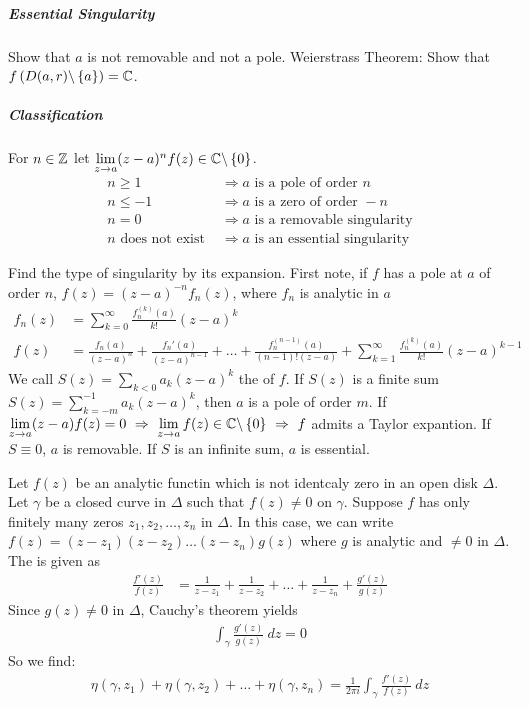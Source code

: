 \subparagraph{Essential Singularity}
Show that $a$ is not removable and not a pole. Weierstrass Theorem: Show that
$f \left( D(a,r) \backslash \left\{ a \right\} \right) = \mathbb{C}$.

\subparagraph{Classification}
For $n \in \mathbb{Z}$ let $\lim\limits_{z \rightarrow a} (z-a)^n f(z) \in \mathbb{C} \backslash
\left\{ 0 \right\}$.
\begin{align*}
    n \geq 1 &\Rightarrow a \text{ is a pole of order } n
    \\
    n \leq -1 &\Rightarrow a \text{ is a zero of order } -n
    \\
    n = 0 &\Rightarrow a \text{ is a removable singularity}
    \\
    n \text{ does not exist } &\Rightarrow a \text{ is an essential singularity}
\end{align*} 

Find the type of singularity by its expansion. First note, if $f$ has a pole at $a$
of order $n$, $f(z) = (z-a)^{-n} f_n(z)$, where $f_n$ is analytic in $a$
\begin{align*}
    f_n (z) &= \sum_{k=0}^\infty \frac{f_n^{(k)} (a)}{k!} (z-a)^k
    \\
    f(z) &= \frac{f_n (a)}{(z-a)^n} + \frac{f_n'(a)}{(z-a)^{n-1}} + \dots + \frac{f_n^{(n-1)} (a)}{(n-1)! (z-a)}
        + \sum_{k=1}^\infty \frac{f_n^{(k)} (a)}{k!} (z-a)^{k-1}
\end{align*}
We call $S(z) = \sum_{k<0} a_k (z-a)^k$ the  of $f$.
If $S(z)$ is a finite sum $S(z) = \sum_{k=-m}^{-1} a_k (z-a)^k$, then $a$ is a pole
of order $m$.
If $\limes{z \rightarrow a} (z-a) f(z) = 0 \ \Rightarrow \ \limes{z \rightarrow a} f(z)
\in \C \backslash \geschwungeneklammer{0} \ \Rightarrow \ f$ admits a Taylor expantion.
If $S \equiv 0$, $a$ is removable. If $S$ is an infinite sum, $a$ is essential.


\begin{theorem}
    Let $f(z)$ be an analytic functin which is not identcaly zero in an open disk
    $\Delta$. Let $\gamma$ be a closed curve in $\Delta$ such that $f(z) \neq 0$ on
    $\gamma$. Suppose $f$ has only finitely many zeros $z_1,z_2,\dots,z_n$ in $\Delta$.
    In this case, we can write $f(z) = (z-z_1)(z-z_2) \dots (z-z_n) g(z)$ where $g$
    is analytic and $\neq 0$ in $\Delta$. The  is given
    as
    \begin{align*}
        \frac{f'(z)}{f(z)} &= \frac{1}{z-z_1} + \frac{1}{z-z_2} + \dots + \frac{1}{z-z_n}
            + \frac{g'(z)}{g(z)}
    \end{align*}
    Since $g(z) \neq 0$ in $\Delta$, Cauchy's theorem yields
    \begin{align*}
        \int_\gamma \frac{g'(z)}{g(z)} \ dz = 0
    \end{align*}
    So we find:
    \begin{align*}
        \eta(\gamma,z_1) + \eta(\gamma,z_2) + \dots + \eta(\gamma,z_n) =
        \frac{1}{2 \pi i} \int_\gamma \frac{f'(z)}{f(z)} \ dz
    \end{align*}
\end{theorem}

